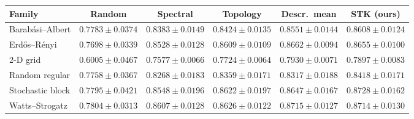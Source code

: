 \setlength{\tabcolsep}{4pt}
\begin{tabular}{lccccc}
\toprule
Family & Random & Spectral & Topology & Descr.\ mean & STK (ours) \\
\midrule
Barab\'asi--Albert & $0.7783\pm0.0374$ & $0.8383\pm0.0149$ & $0.8424\pm0.0135$ & $0.8551\pm0.0144$ & $\mathbf{0.8608}\pm0.0124$ \\
Erd\H{o}s--R\'enyi & $0.7698\pm0.0339$ & $0.8528\pm0.0128$ & $0.8609\pm0.0109$ & $\mathbf{0.8662}\pm0.0094$ & $0.8655\pm0.0100$ \\
2-D grid & $0.6005\pm0.0467$ & $0.7577\pm0.0066$ & $0.7724\pm0.0064$ & $\mathbf{0.7930}\pm0.0071$ & $0.7897\pm0.0083$ \\
Random regular & $0.7758\pm0.0367$ & $0.8268\pm0.0183$ & $0.8359\pm0.0171$ & $0.8317\pm0.0188$ & $\mathbf{0.8418}\pm0.0171$ \\
Stochastic block & $0.7795\pm0.0421$ & $0.8548\pm0.0196$ & $0.8622\pm0.0197$ & $0.8647\pm0.0167$ & $\mathbf{0.8728}\pm0.0162$ \\
Watts--Strogatz & $0.7804\pm0.0313$ & $0.8607\pm0.0128$ & $0.8626\pm0.0122$ & $\mathbf{0.8715}\pm0.0127$ & $0.8714\pm0.0130$ \\
\bottomrule
\end{tabular}
